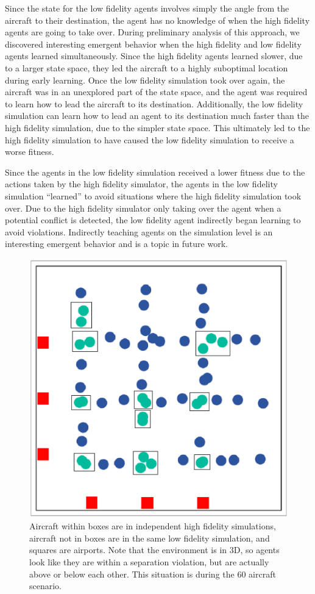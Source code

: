 \documentclass{sig-alternate}
\begin{document}
Since the state for the low fidelity agents involves simply the angle from the aircraft to their destination, the agent has no knowledge of when the high fidelity agents are going to take over. During preliminary analysis of this approach, we discovered interesting emergent behavior when the high fidelity and low fidelity agents learned simultaneously. Since the high fidelity agents learned slower, due to a larger state space, they led the aircraft to a highly suboptimal location during early learning. Once the low fidelity simulation took over again, the aircraft was in an unexplored part of the state space, and the agent was required to learn how to lead the aircraft to its destination. Additionally, the low fidelity simulation can learn how to lead an agent to its destination much faster than the high fidelity simulation, due to the simpler state space. This ultimately led to the high fidelity simulation to have caused the low fidelity simulation to receive a worse fitness. 

Since the agents in the low fidelity simulation received a lower fitness due to the actions taken by the high fidelity simulator, the agents in the low fidelity simulation ``learned'' to avoid situations where the high fidelity simulation took over. Due to the high fidelity simulator only taking over the agent when a potential conflict is detected, the low fidelity agent indirectly began learning to avoid violations. Indirectly teaching agents on the simulation level is an interesting emergent behavior and is a topic in future work.

\begin{figure}
\includegraphics[width=.75\columnwidth]{Animate3d-60HF-FixedColor.eps}
\centering
\caption{Aircraft within boxes are in independent high fidelity simulations, aircraft not in boxes are in the same low fidelity simulation, and squares are airports. Note that the environment is in 3D, so agents look like they are within a separation violation, but are actually above or below each other. This situation is during the 60 aircraft scenario.}
\label{fig:60AircraftHF}
\end{figure}
\end{document}
